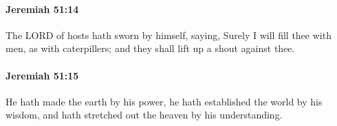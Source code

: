 		\paragraph{Jeremiah 51:14} %
			\label{JEREMIAH-51-14}

			The LORD of hosts hath sworn by himself, saying, Surely I will fill thee with men, as with caterpillers; and they shall lift up a shout against thee.


		\paragraph{Jeremiah 51:15} %
			\label{JEREMIAH-51-15}

			He hath made the earth by his power, he hath established the world by his wisdom, and hath stretched out the heaven by his understanding.


